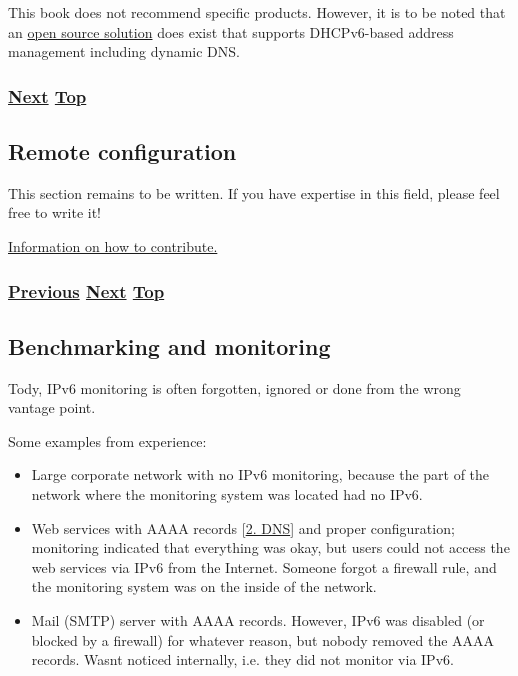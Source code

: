 \documentclass[
]{article}
\begin{document}
This book does not recommend specific products. However, it is to be
noted that an \href{https://www.isc.org/kea/}{open source solution} does
exist that supports DHCPv6-based address management including dynamic
DNS.

\subsubsection{\texorpdfstring{\hyperref[remote-configuration]{Next}
\hyperref[management-and-operations]{Top}}{Next Top}}\label{next-top-5}

\pagebreak

\subsection{Remote configuration}\label{remote-configuration}

This section remains to be written. If you have expertise in this field,
please feel free to write it!

\href{https://github.com/becarpenter/book6/tree/main/99.\%20Chapter\%20Template/99.\%20Chapter\%20Template.md}{Information
on how to contribute.}

\subsubsection{\texorpdfstring{\hyperref[address-and-prefix-management]{Previous}
\hyperref[benchmarking-and-monitoring]{Next}
\hyperref[management-and-operations]{Top}}{Previous Next Top}}\label{previous-next-top-27}

\pagebreak

\subsection{Benchmarking and
monitoring}\label{benchmarking-and-monitoring}

Tody, IPv6 monitoring is often forgotten, ignored or done from the wrong
vantage point.

Some examples from experience:

\begin{itemize}
\item
  Large corporate network with no IPv6 monitoring, because the part of
  the network where the monitoring system was located had no IPv6.
\item
  Web services with AAAA records {[}\hyperref[dns]{2. DNS}{]} and proper
  configuration; monitoring indicated that everything was okay, but
  users could not access the web services via IPv6 from the Internet.
  Someone forgot a firewall rule, and the monitoring system was on the
  inside of the network.
\item
  Mail (SMTP) server with AAAA records. However, IPv6 was disabled (or
  blocked by a firewall) for whatever reason, but nobody removed the
  AAAA records. Wasn\textquotesingle t noticed internally, i.e. they did
  not monitor via IPv6.
\end{itemize}
\end{document}
